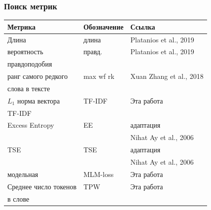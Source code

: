 \documentclass{beamer}
\begin{document}
\begin{frame}
	\frametitle{Поиск метрик}
	
	\begin{table}
		\begin{tabular}{|l|l|l|}
			\hline
			Метрика & Обозначение & Ссылка \\
			\hline
			Длина & длина & Platanios et al., 2019 \\
			\hline
			вероятность & правд. & Platanios et al., 2019 \\ 
			правдоподобия & & \\
			\hline
			ранг самого редкого & max wf rk & Xuan Zhang et al., 2018 \\
			слова в тексте & & \\
			\hline
			\hline
			$L_1$ норма вектора & TF-IDF & Эта работа \\
			TF-IDF & & \\
			\hline
			Excess Entropy & EE & адаптация \\
			& & Nihat Ay et al., 2006 \\
			\hline
			TSE & TSE & адаптация \\
			& & Nihat Ay et al., 2006 \\
			\hline
			модельная & MLM-loss & Эта работа \\
			\hline
			Среднее число токенов & TPW & Эта работа \\
			в слове & & \\
			\hline
		\end{tabular}
	\end{table}
	
\end{frame}
\end{document}
